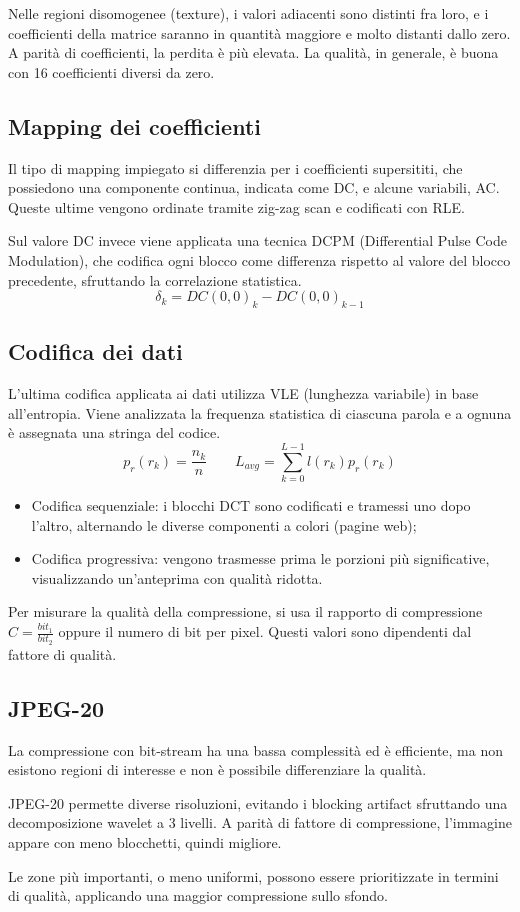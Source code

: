 Nelle regioni disomogenee (texture), i valori adiacenti sono distinti fra loro, e i coefficienti della matrice saranno in quantità maggiore e molto distanti dallo zero. A parità di coefficienti, la perdita è più elevata. La qualità, in generale, è buona con 16 coefficienti diversi da zero.

\subsection{Mapping dei coefficienti}
Il tipo di mapping impiegato si differenzia per i coefficienti supersititi, che possiedono una componente continua, indicata come DC, e alcune variabili, AC. Queste ultime vengono ordinate tramite zig-zag scan e codificati con RLE.

Sul valore DC invece viene applicata una tecnica DCPM (Differential Pulse Code Modulation), che codifica ogni blocco come differenza rispetto al valore del blocco precedente, sfruttando la correlazione statistica.
$$\delta_k = DC(0, 0)_k - DC(0, 0)_{k-1}$$

\subsection{Codifica dei dati}
L'ultima codifica applicata ai dati utilizza VLE (lunghezza variabile) in base all'entropia. Viene analizzata la frequenza statistica di ciascuna parola e a ognuna è assegnata una stringa del codice. 
$$p_r(r_k) = \frac{n_k}{n} \qquad L_{avg} = \sum_{k=0}^{L-1} l(r_k)p_r(r_k)$$

\begin{itemize}
	\item Codifica sequenziale: i blocchi DCT sono codificati e tramessi uno dopo l'altro, alternando le diverse componenti a colori (pagine web);
	\item Codifica progressiva: vengono trasmesse prima le porzioni più significative, visualizzando un'anteprima con qualità ridotta.
\end{itemize}

Per misurare la qualità della compressione, si usa il rapporto di compressione $C = \frac{bit_1}{bit_2}$ oppure il numero di bit per pixel. Questi valori sono dipendenti dal fattore di qualità. 

\subsection{JPEG-20}
La compressione con bit-stream ha una bassa complessità ed è efficiente, ma non esistono regioni di interesse e non è possibile differenziare la qualità.

JPEG-20 permette diverse risoluzioni, evitando i blocking artifact sfruttando una decomposizione wavelet a 3 livelli. A parità di fattore di compressione, l'immagine appare con meno blocchetti, quindi migliore.

Le zone più importanti, o meno uniformi, possono essere prioritizzate in termini di qualità, applicando una maggior compressione sullo sfondo.



